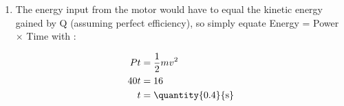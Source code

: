 \begin{problem}[AO1984PIQ1a]
{\begin{enumerate}
	\item The energy input from the motor would have to equal the kinetic energy gained by Q (assuming perfect efficiency), so simply equate Energy = Power $\times$ Time with :

\begin{align*} 
Pt &= \frac{1}{2}mv^{2} \\
 40t &= 16 \\ 
 t&= \mbox{\quantity{0.4}{s}} 
 \end{align*}

\end{enumerate}
}
\end{problem}